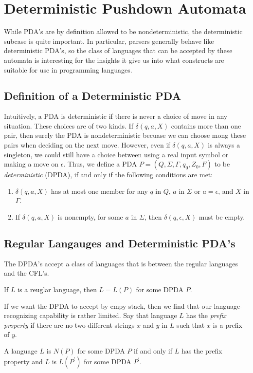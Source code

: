 \documentclass[]{article}
\begin{document}
\section*{Deterministic Pushdown Automata}
  While PDA's are by definition allowed to be nondeterministic, the
  deterministic subcase is quite important. In particular, parsers generally
  behave like deterministic PDA's, so the class of languages that can be
  accepted by these automata is interesting for the insights it give us into
  what constructs are suitable for use in programming languages.

  \subsection*{Definition of a Deterministic PDA}
    Intuitively, a PDA is deterministic if there is never a choice of move in
    any situation. These choices are of two kinds. If $\delta(q,a,X)$ contains
    more than one pair, then surely the PDA is nondeterministic becuase we can
    choose mong these pairs when deciding on the next move. However, even if
    $\delta(q,a,X)$ is always a singleton, we could still have a choice between
    using a real input symbol or making a move on $\epsilon$. Thus, we define a
    PDA $P = (Q,\Sigma,\Gamma,q_0,Z_0,F)$ to be \emph{deterministic} (DPDA), if
    and only if the following conditions are met:
      \begin{enumerate}
        \item $\delta(q,a,X)$ has at most one member for any $q$ in $Q$, $a$ in
        $\Sigma$ or $a = \epsilon$, and $X$ in $\Gamma$.
        \item If $\delta(q,a,X)$ is nonempty, for some $a$ in $\Sigma$, then
        $\delta(q,\epsilon,X)$ must be empty.
      \end{enumerate}

  \subsection*{Regular Langauges and Deterministic PDA's}
    The DPDA's accept a class of languages that is between the regular languages
    and the CFL's.
      \begin{thm}
        If $L$ is a reuglar language, then $L = L(P)$ for some DPDA $P$.
      \end{thm}
    If we want the DPDA to accept by empy stack, then we find that our
    language-recognizing capability is rather limited. Say that language $L$ has
    the \emph{prefix property} if there are no two different strings $x$ and $y$
    in $L$ such that $x$ is a prefix of $y$.
      \begin{thm}
        A language $L$ is $N(P)$ for some DPDA $P$ if and only if $L$ has the
        prefix property and $L$ is $L(P^\prime)$ for some DPDA $P^\prime$.
      \end{thm}
\end{document}
